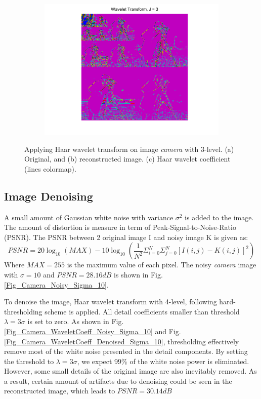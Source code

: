 \documentclass[11pt]{article}
\begin{document}
\begin{figure}[H]
\begin{subfigure}{0.4\textwidth}
		\caption{}
		\label{Fig_Camera_Reconstruction}
	\end{subfigure}
	\begin{subfigure}{0.4\textwidth}
        \centering
		\includegraphics[trim=0.5in 0.1in 0.5in 0in, width=\textwidth]{Fig_Camera_WaveletCoeff.png}
		\caption{}
		\label{Fig_Camera_WaveletCoeff}
	\end{subfigure}
	\caption{Applying Haar wavelet transform on image \textit{camera} with 3-level. (a) Original, and (b) reconstructed image. (c) Haar wavelet coefficient (lines colormap).}\label{Fig_Camera_WaveletTransform}
\end{figure}

\subsection{Image Denoising}
A small amount of Gaussian white noise with variance $\sigma^2$ is added to the image. The amount of distortion is measure in term of Peak-Signal-to-Noise-Ratio (PSNR). The PSNR between 2 original image I and noisy image K is given as:
$$ PSNR = 20\log_{10}{(MAX)} - 10\log_{10}{\left(\frac{1}{N^2} \Sigma_{i=0}^N \Sigma_{j=0}^N [I(i, j) - K(i, j)]^2 \right)}
$$
Where $MAX = 255$ is the maximum value of each pixel. The noisy \textit{camera} image with $\sigma = 10$ and $PSNR = 28.16dB$ is shown in Fig.\ref{Fig_Camera_Noisy_Sigma_10}. 

To denoise the image, Haar wavelet transform with 4-level, following hard-thresholding scheme is applied. All detail coefficients smaller than threshold $\lambda = 3\sigma$ is set to zero. As shown in Fig.\ref{Fig_Camera_WaveletCoeff_Noisy_Sigma_10} and Fig.\ref{Fig_Camera_WaveletCoeff_Denoised_Sigma_10}, thresholding effectively remove most of the white noise presented in the detail components. By setting the threshold to $\lambda = 3\sigma$, we expect 99\% of the white noise power is eliminated. However, some small details of the original image are also inevitably removed. As a result, certain amount of artifacts due to denoising could be seen in the reconstructed image, which leads to $PSNR = 30.14dB$
\end{document}
